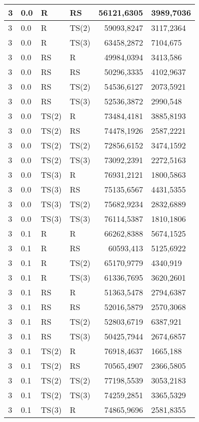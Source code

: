 \documentclass[twoside]{iisthesis}
\begin{document}
\begin{center}
\begin{longtable}{|l|l|l|l|r@{$\pm$}l|}
		3 & 0.0 & R & RS & 56121,6305 & 3989,7036\\ \hline
		3 & 0.0 & R & TS(2) & 59093,8247 & 3117,2364\\ \hline
		3 & 0.0 & R & TS(3) & 63458,2872 & 7104,675\\ \hline
		3 & 0.0 & RS & R & 49984,0394 & 3413,586\\ \hline
		3 & 0.0 & RS & RS & 50296,3335 & 4102,9637\\ \hline
		3 & 0.0 & RS & TS(2) & 54536,6127 & 2073,5921\\ \hline
		3 & 0.0 & RS & TS(3) & 52536,3872 & 2990,548\\ \hline
		3 & 0.0 & TS(2) & R & 73484,4181 & 3885,8193\\ \hline
		3 & 0.0 & TS(2) & RS & 74478,1926 & 2587,2221\\ \hline
		3 & 0.0 & TS(2) & TS(2) & 72856,6152 & 3474,1592\\ \hline
		3 & 0.0 & TS(2) & TS(3) & 73092,2391 & 2272,5163\\ \hline
		3 & 0.0 & TS(3) & R & 76931,2121 & 1800,5863\\ \hline
		3 & 0.0 & TS(3) & RS & 75135,6567 & 4431,5355\\ \hline
		3 & 0.0 & TS(3) & TS(2) & 75682,9234 & 2832,6889\\ \hline
		3 & 0.0 & TS(3) & TS(3) & 76114,5387 & 1810,1806\\ \hline
		3 & 0.1 & R & R & 66262,8388 & 5674,1525\\ \hline
		3 & 0.1 & R & RS & 60593,413 & 5125,6922\\ \hline
		3 & 0.1 & R & TS(2) & 65170,9779 & 4340,919\\ \hline
		3 & 0.1 & R & TS(3) & 61336,7695 & 3620,2601\\ \hline
		3 & 0.1 & RS & R & 51363,5478 & 2794,6387\\ \hline
		3 & 0.1 & RS & RS & 52016,5879 & 2570,3068\\ \hline
		3 & 0.1 & RS & TS(2) & 52803,6719 & 6387,921\\ \hline
		3 & 0.1 & RS & TS(3) & 50425,7944 & 2674,6857\\ \hline
		3 & 0.1 & TS(2) & R & 76918,4637 & 1665,188\\ \hline
		3 & 0.1 & TS(2) & RS & 70565,4907 & 2366,5805\\ \hline
		3 & 0.1 & TS(2) & TS(2) & 77198,5539 & 3053,2183\\ \hline
		3 & 0.1 & TS(2) & TS(3) & 74259,2851 & 3365,5329\\ \hline
		3 & 0.1 & TS(3) & R & 74865,9696 & 2581,8355\\ \hline

\end{longtable}
\end{center}
\end{document}
